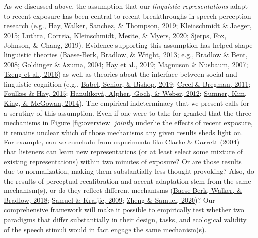 \documentclass[
  11pt,
  english,
  man,floatsintext]{apa6}
\begin{document}
As we discussed above, the assumption that our \emph{linguistic representations} adapt to recent exposure has been central to recent breakthroughs in speech perception research (e.g., \protect\hyperlink{ref-hay2019}{Hay, Walker, Sanchez, \& Thompson, 2019}; \protect\hyperlink{ref-kleinschmidt-jaeger2015}{Kleinschmidt \& Jaeger, 2015}; \protect\hyperlink{ref-luthra2020a}{Luthra, Correia, Kleinschmidt, Mesite, \& Myers, 2020}; \protect\hyperlink{ref-sjerps2019}{Sjerps, Fox, Johnson, \& Chang, 2019}). Evidence supporting this assumption has helped shape linguistic theories (\protect\hyperlink{ref-baeseberk2013}{Baese-Berk, Bradlow, \& Wright, 2013}; e.g., \protect\hyperlink{ref-bradlow-bent2008}{Bradlow \& Bent, 2008}; \protect\hyperlink{ref-goldinger-azuma2004}{Goldinger \& Azuma, 2004}; \protect\hyperlink{ref-hay2019}{Hay et al., 2019}; \protect\hyperlink{ref-magnuson-nusbaum2007}{Magnuson \& Nusbaum, 2007}; \protect\hyperlink{ref-tzeng2016}{Tzeng et al., 2016}) as well as theories about the interface between social and linguistic cognition (e.g., \protect\hyperlink{ref-babel2019}{Babel, Senior, \& Bishop, 2019}; \protect\hyperlink{ref-creel-bregman2011}{Creel \& Bregman, 2011}; \protect\hyperlink{ref-foulkes-hay2015}{Foulkes \& Hay, 2015}; \protect\hyperlink{ref-hanulikova2012}{Hanulíková, Alphen, Goch, \& Weber, 2012}; \protect\hyperlink{ref-sumner2014}{Sumner, Kim, King, \& McGowan, 2014}). The empirical indeterminacy that we present calls for a scrutiny of this assumption. Even if one were to take for granted that the three mechanisms in Figure \ref{fig:overview} \emph{jointly} underlie the effects of recent exposure, it remains unclear which of those mechanisms any given results sheds light on. For example, can we conclude from experiments like \protect\hyperlink{ref-clarke-garrett2004}{Clarke \& Garrett} (\protect\hyperlink{ref-clarke-garrett2004}{2004}) that listeners can learn new representations (or at least select some mixture of existing representations) within two minutes of exposure? Or are those results due to normalization, making them substantially less thought-provoking? Also, do the results of perceptual recalibration and accent adaptation stem from the same mechanism(s), or do they reflect different mechanisms (\protect\hyperlink{ref-baeseberk2018}{Baese-Berk, Walker, \& Bradlow, 2018}; \protect\hyperlink{ref-samuel-kraljic2009}{Samuel \& Kraljic, 2009}; \protect\hyperlink{ref-zheng-samuel2020}{Zheng \& Samuel, 2020})? Our comprehensive framework will make it possible to empirically test whether two paradigms that differ substantially in their design, tasks, and ecological validity of the speech stimuli would in fact engage the same mechanism(s).
\end{document}
